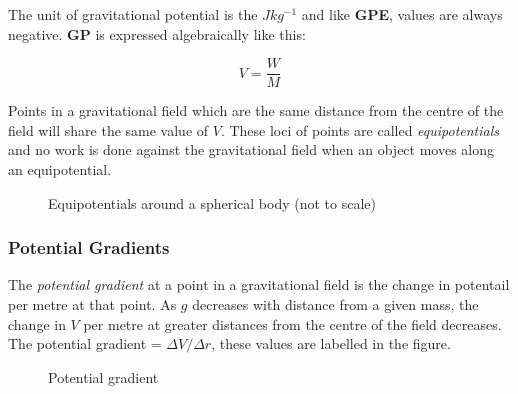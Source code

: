 \documentclass[12pt]{article}
\begin{document}
The unit of gravitational potential is the \(Jkg^{-1}\) and like \textbf{GPE}, values are always negative. \textbf{GP} is expressed algebraically like this:

\[V = \dfrac{W}{M}\]

Points in a gravitational field which are the same distance from the centre of the field will share the same value of \(V\). These loci of points are called \emph{equipotentials} and no work is done against the gravitational field when an object moves along an equipotential.


\begin{figure}[H]
\centering
{}
\caption{Equipotentials around a spherical body (not to scale)}
\end{figure}

\subsubsection{Potential Gradients}
\label{sec:org4362695}

The \emph{potential gradient} at a point in a gravitational field is the change in potentail per metre at that point. As \(g\) decreases with distance from a given mass, the change in \(V\) per metre at greater distances from the centre of the field decreases. The potential gradient = \(\Delta V / \Delta r\), these values are labelled in the figure.

\begin{figure}[H]
\centering
{}
\caption{Potential gradient}
\end{figure}
\end{document}
